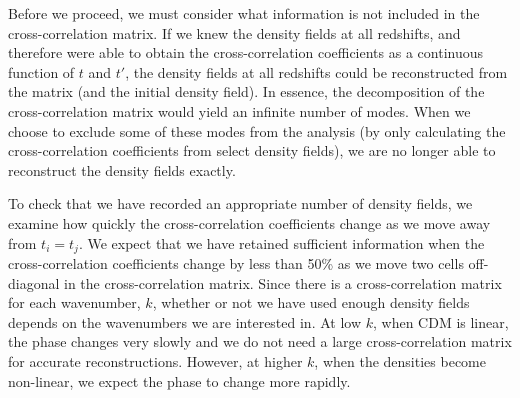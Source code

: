 \documentclass[twocolumn,superscriptaddress,prd]{revtex4}
\begin{document}
Before we proceed, we must consider what information is not included
in the cross-correlation matrix. 
If we knew the density fields at all redshifts, and
therefore were able to obtain the cross-correlation coefficients as a continuous
function of $t$ and $t'$, the density fields at all redshifts could be
reconstructed from the matrix (and the initial
density field). 
In essence, the decomposition
of the cross-correlation matrix would yield an
infinite number of modes. %
When we choose to exclude some of these modes from the analysis (by
only calculating the cross-correlation coefficients from select
density fields), we
are no longer able to reconstruct the density fields exactly.

To check that we have recorded an appropriate number of density fields, 
we examine how quickly the cross-correlation
coefficients change as we move away from
$t_i=t_j$.  We expect that we have retained sufficient information
when the cross-correlation coefficients change by less than 50\% as we move
two cells off-diagonal in the cross-correlation matrix.  
Since there is a cross-correlation matrix
for each wavenumber, $k$, whether or not we have used
enough density fields depends on the wavenumbers we are
interested in.  At low $k$, when CDM is linear, the phase
changes very slowly and we do not need a large cross-correlation
matrix for accurate reconstructions.  However, at higher $k$,
when the densities become non-linear, we expect the phase to change
more rapidly.  %
\end{document}
